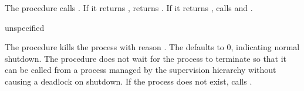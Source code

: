 The  procedure calls
. If it returns
,  returns . If
it returns , 
calls  and .

\begin{procedure}
\end{procedure}
\returns{} unspecified

The  procedure kills the
 process with reason . The
 defaults to 0, indicating normal shutdown. The
procedure does not wait for the  process to
terminate so that it can be called from a process managed by the
supervision hierarchy without causing a deadlock on shutdown. If the
 process does not exist,
 calls .

